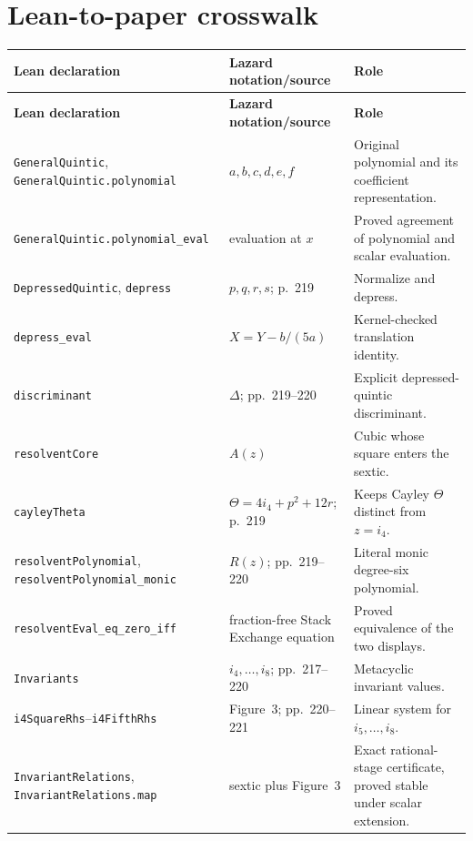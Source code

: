 \documentclass[11pt,a4paper,oneside]{article}
\newcommand{\lean}[1]{\nolinkurl{#1}}
\newcommand{\ii}[1]{i_{#1}}
\begin{document}
\section{Lean-to-paper crosswalk}

\small
{}
\begin{longtable}{>{\raggedright\arraybackslash}p{}
                  >{\raggedright\arraybackslash}p{}
                  >{\raggedright\arraybackslash}p{}}
\toprule
\rowcolor{SoftBlue}
\textbf{Lean declaration} & \textbf{Lazard notation/source} & \textbf{Role} \\
\midrule
\endfirsthead
\toprule
\rowcolor{SoftBlue}
\textbf{Lean declaration} & \textbf{Lazard notation/source} & \textbf{Role} \\
\midrule
\endhead
\lean{GeneralQuintic}, \lean{GeneralQuintic.polynomial} & $a,b,c,d,e,f$ & Original polynomial and its coefficient representation.\\
\lean{GeneralQuintic.polynomial_eval} & evaluation at $x$ & Proved agreement of polynomial and scalar evaluation.\\
\lean{DepressedQuintic}, \lean{depress} & $p,q,r,s$; p.~219 & Normalize and depress.\\
\lean{depress_eval} & $X=Y-b/(5a)$ & Kernel-checked translation identity.\\
\lean{discriminant} & $\Delta$; pp.~219--220 & Explicit depressed-quintic discriminant.\\
\lean{resolventCore} & $A(z)$ & Cubic whose square enters the sextic.\\
\lean{cayleyTheta} & $\Theta=4\ii4+p^2+12r$; p.~219 & Keeps Cayley $\Theta$ distinct from $z=\ii4$.\\
\lean{resolventPolynomial}, \lean{resolventPolynomial_monic} & $R(z)$; pp.~219--220 & Literal monic degree-six polynomial.\\
\lean{resolventEval_eq_zero_iff} & fraction-free Stack Exchange equation & Proved equivalence of the two displays.\\
\lean{Invariants} & $\ii4,\ldots,\ii8$; pp.~217--220 & Metacyclic invariant values.\\
\lean{i4SquareRhs}--\lean{i4FifthRhs} & Figure~3; pp.~220--221 & Linear system for $\ii5,\ldots,\ii8$.\\
\lean{InvariantRelations}, \lean{InvariantRelations.map} & sextic plus Figure~3 & Exact rational-stage certificate, proved stable under scalar extension.\\

\end{longtable}
\end{document}
